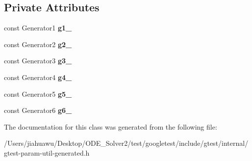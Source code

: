 \subsection*{Private Attributes}
\begin{DoxyCompactItemize}
\item 
\mbox{\label{classtesting_1_1internal_1_1_cartesian_product_holder6_afc75796d0a193b4aa71295d4d5fbf2f9}} 
const Generator1 {\bfseries g1\+\_\+}
\item 
\mbox{\label{classtesting_1_1internal_1_1_cartesian_product_holder6_a185518a6b93cca4e81bb9b5e3ca7da0f}} 
const Generator2 {\bfseries g2\+\_\+}
\item 
\mbox{\label{classtesting_1_1internal_1_1_cartesian_product_holder6_a1af93c009cd3025e89dab8f683b5d8f8}} 
const Generator3 {\bfseries g3\+\_\+}
\item 
\mbox{\label{classtesting_1_1internal_1_1_cartesian_product_holder6_a1990e6efc632ee98355e47d52a3b75d1}} 
const Generator4 {\bfseries g4\+\_\+}
\item 
\mbox{\label{classtesting_1_1internal_1_1_cartesian_product_holder6_a6ad540ef1089ead5b0236cf093ba69bc}} 
const Generator5 {\bfseries g5\+\_\+}
\item 
\mbox{\label{classtesting_1_1internal_1_1_cartesian_product_holder6_a7dd7b7c05d778735c54a6aa72715e609}} 
const Generator6 {\bfseries g6\+\_\+}
\end{DoxyCompactItemize}


The documentation for this class was generated from the following file\+:\begin{DoxyCompactItemize}
\item 
/\+Users/jiahuawu/\+Desktop/\+O\+D\+E\+\_\+\+Solver2/test/googletest/include/gtest/internal/gtest-\/param-\/util-\/generated.\+h\end{DoxyCompactItemize}
